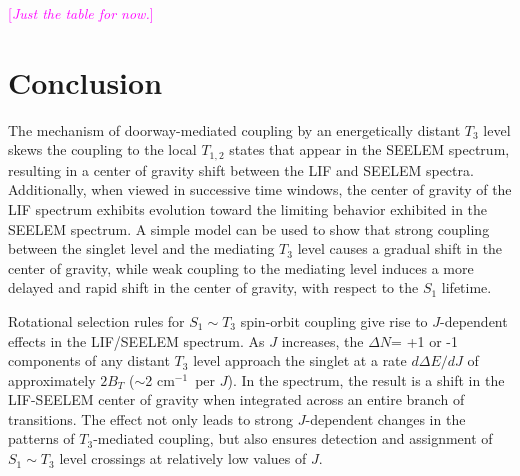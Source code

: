 \documentclass[12pt]{mitthesis}
\newcommand{\NOTE} [1]{\textcolor{magenta}{[\emph{#1}]}}
\newcommand{\POINT}[1]{\textcolor{magenta}{\textbf{POINT:} #1}}
\newcommand{\rcm}{cm$^{-1}$}
\begin{document}

\NOTE{Just the table for now.}





























\section{Conclusion}

The mechanism of doorway-mediated coupling by an energetically distant
$T_3$ level skews the coupling to the local $T_{1,2}$ states that
appear in the SEELEM spectrum, resulting in a center of gravity shift
between the LIF and SEELEM spectra.  Additionally, when viewed in
successive time windows, the center of gravity of the LIF spectrum
exhibits evolution toward the limiting behavior exhibited in the
SEELEM spectrum.  A simple model can be used to show that strong
coupling between the singlet level and the mediating $T_3$ level
causes a gradual shift in the center of gravity, while weak coupling
to the mediating level induces a more delayed and rapid shift in the
center of gravity, with respect to the $S_1$ lifetime.

Rotational selection rules for $S_1 \sim T_3$ spin-orbit coupling give
rise to $J$-dependent effects in the LIF/SEELEM spectrum.  As $J$
increases, the $\Delta N$= +1 or -1 components of any distant $T_3$
level approach the singlet at a rate $d\Delta E / dJ$ of approximately
$2B_T$ ($\sim$2 \rcm\ per $J$).  In the spectrum, the result is a
shift in the LIF-SEELEM center of gravity when integrated across an
entire branch of transitions.  The effect not only leads to strong
$J$-dependent changes in the patterns of $T_3$-mediated coupling, but
also ensures detection and assignment of $S_1 \sim T_3$ level
crossings at relatively low values of $J$.

\end{document}
